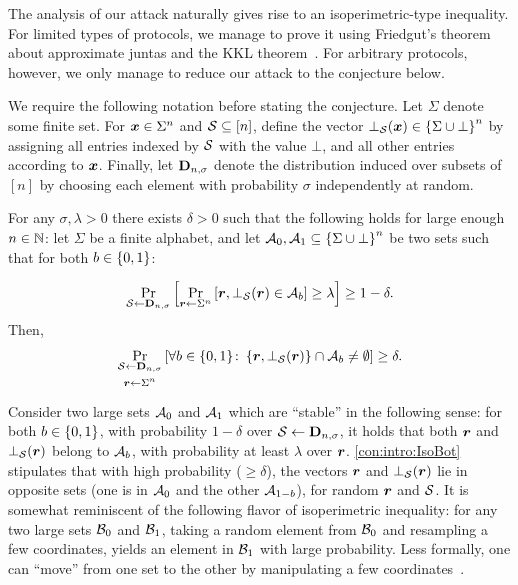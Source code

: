 The analysis of our attack naturally gives rise to an isoperimetric-type inequality. For limited types of protocols, we manage to prove it using Friedgut's theorem~\cite{Friedgut98} about approximate juntas and the KKL theorem~\cite{KKL88}. For arbitrary protocols, however, we only manage to reduce our attack to the conjecture below.

We require the following notation before stating the conjecture. Let $\Sigma$ denote some finite set.
For ${ \boldsymbol{x}}\in \Sigma^n$ and $\mathcal{S} \subseteq [n]$, define the vector $\bot_{\mathcal{S}}({ \boldsymbol{x}}) \in \left\{\Sigma \cup \bot\right\}^n$ by assigning all entries indexed by $\mathcal{S}$ with the value $\bot$, and all other entries according to ${ \boldsymbol{x}}$. Finally, let $\mathbf{D}_{n,\sigma}$ denote the distribution induced over subsets of $[n]$ by choosing each element with probability $\sigma$ independently at random.

\def\MainConj{
For any $\sigma,\lambda >0$ there exists $\delta>0$ such that the following holds for large enough $n\in \N$: let $\Sigma$ be a finite alphabet, and let $\cA_0,\cA_1 \subseteq \sbn$ be two sets such that for both $b\in \zo$:

\begin{align*}%
\ppr{\cs\gets \bns}{\ppr{\vr \gets \Sigma^n}{\vr,\bot_{\cS}(\vr) \in \cA_b} \ge \lambda } \ge 1-\delta.
\end{align*}
Then,
\begin{align*}%
\ppr{\substack{\cS \gets \bns \vspace{.05in}\\ \vr\gets \Sigma^n }}{\forall b\in \zo\colon \set{\vr,\bot_{\cS}(\vr)} \cap \cA_b \neq \emptyset} \ge \delta.
\end{align*}
}

\begin{conjecture}\label{con:intro:IsoBot}
\MainConj
\end{conjecture}

\noindent
Consider two large sets $\mathcal{A}_0$ and $\mathcal{A}_1$ which are ``stable'' in the following sense: for both $b\in \{0,1\}$, with probability $1-\delta$ over $\mathcal{S}\gets \mathbf{D}_{n,\sigma}$, it holds that both ${ \boldsymbol{r}}$ and $\bot_{\mathcal{S}}({ \boldsymbol{r}})$ belong to $\mathcal{A}_b$, with probability at least $\lambda$ over ${ \boldsymbol{r}}$. \cref{con:intro:IsoBot} stipulates that with high probability ($\ge \delta$), the vectors ${ \boldsymbol{r}}$ and $\bot_{\mathcal{S}}({ \boldsymbol{r}})$ lie in opposite sets (\ie one is in $\mathcal{A}_0$ and the other $\mathcal{A}_{1-b}$), for random ${ \boldsymbol{r}}$ and $\mathcal{S}$. It is somewhat reminiscent of the following flavor of isoperimetric inequality: for any two large sets $\mathcal{B}_0$ and $\mathcal{B}_1$, taking a random element from $\mathcal{B}_0$ and resampling a few coordinates, yields an element in $\mathcal{B}_1$ with large probability. Less formally, one can ``move'' from one set to the other by manipulating a few coordinates~\cite{MosselORSS2006,MosselOS2013}.

